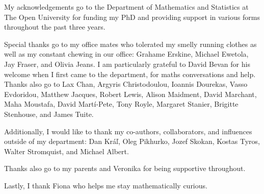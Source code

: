 \documentclass[12pt, a4paper, twoside]{report}
\begin{document}
My acknowledgements go to the Department of Mathematics and Statistics at The Open University for funding my PhD and providing support in various forms throughout the past three years.

Special thanks go to my office mates who tolerated my smelly running clothes as well as my constant chewing in our office: Grahame Erskine, Michael Ewetola, Jay Fraser, and Olivia Jeans. I am particularly grateful to David Bevan for his welcome when I first came to the department, for maths conversations and help. Thanks also go to Lax Chan, Argyris Christodoulou, Ioannis Dourekas, Vasso Evdoridou, Matthew Jacques, Robert Lewis, Alison Maidment, David Marchant, Maha Moustafa, David Mart\'{i}-Pete, Tony Royle, Margaret Stanier, Brigitte Stenhouse, and James Tuite.

Additionally, I would like to thank my co-authors, collaborators, and influences outside of my department: Dan Kr\'a\v{l}, Oleg Pikhurko, Jozef Skokan, Kostas Tyros, Walter Stromquist, and Michael Albert.

Thanks also go to my parents and Veronika for being supportive throughout.

Lastly, I thank Fiona who helps me stay mathematically curious.
\afterpage{\null\newpage}
\end{document}

